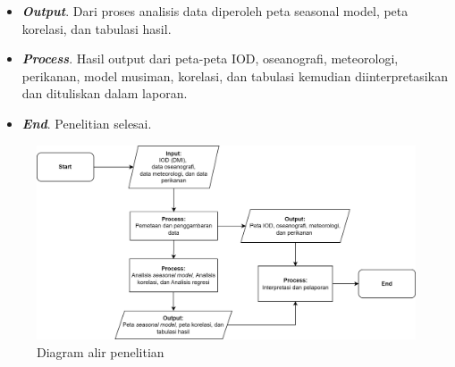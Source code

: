 \begin{spacing}{1.5}
\begin{itemize}
		\item \textbf{\textit{Output}}. Dari proses analisis data diperoleh peta seasonal model, peta korelasi, dan tabulasi hasil.
		\item \textbf{\textit{Process}}. Hasil output dari peta-peta IOD, oseanografi, meteorologi, perikanan, model musiman, korelasi, dan tabulasi kemudian diinterpretasikan dan dituliskan dalam laporan.
		\item \textbf{\textit{End}}. Penelitian selesai.
	\end{itemize}
	\begin{figure}[H]
		\centering
		\includegraphics[width=14cm]{contents/Figures/Flowchart_Diagram.png}
		\caption{Diagram alir penelitian}
		\label{fig:flowchart}
	\end{figure}
\end{spacing}
